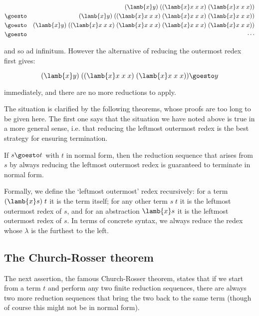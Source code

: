 \begin{eqnarray*}
& & (\lamb{x} y)\; ((\lamb{x} x\; x\; x)\; (\lamb{x} x\; x\; x)) \\
& \goesto & (\lamb{x} y)\; ((\lamb{x} x\; x\; x)\; (\lamb{x} x\; x\; x)\;
                            (\lamb{x} x\; x\; x))               \\
& \goesto & (\lamb{x} y)\; ((\lamb{x} x\; x\; x)\; (\lamb{x} x\; x\; x)\;
                            (\lamb{x} x\; x\; x)\; (\lamb{x} x\; x\; x))  \\
& \goesto & \cdots
\end{eqnarray*}

\noindent and so ad infinitum. However the alternative of reducing the
outermost redex first gives:

$$ (\lamb{x} y)\; ((\lamb{x} x\; x\; x)\;(\lamb{x} x\; x\; x)) \goesto y $$

\noindent immediately, and there are no more reductions to apply.

The situation is clarified by the following theorems, whose proofs are too long
to be given here. The first one says that the situation we have noted above is
true in a more general sense, i.e. that reducing the leftmost outermost redex
is the best strategy for ensuring termination.

\begin{theorem}
If $s \goesto t$ with $t$ in normal form, then the reduction sequence that
arises from $s$ by always reducing the leftmost outermost redex is guaranteed
to terminate in normal form.
\end{theorem}

Formally, we define the `leftmost outermost' redex recursively: for a term
$(\lamb{x} s)\;t$ it is the term itself; for any other term $s\;t$ it is the
leftmost outermost redex of $s$, and for an abstraction $\lamb{x} s$ it is the
leftmost outermost redex of $s$. In terms of concrete syntax, we always reduce
the redex whose $\lambda$ is the furthest to the left.

\subsection{The Church-Rosser theorem}

The next assertion, the famous Church-Rosser theorem, states that if we start
from a term $t$ and perform any two finite reduction sequences, there are
always two more reduction sequences that bring the two back to the same term
(though of course this might not be in normal form).

